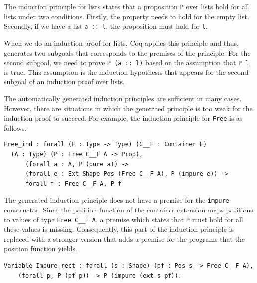\documentclass[a4paper, 11pt, fleqn, twoside]{scrreprt}
\newcommand{\cinl}[1]{\texttt{#1}}
\begin{document}
The induction principle for lists states that a proposition \cinl{P} over lists hold for all lists under two conditions.
Firstly, the property needs to hold for the empty list.
Secondly, if we have a list \cinl{a :: l}, the proposition must hold for \cinl{l}.

When we do an induction proof for lists, Coq applies this principle and thus, generates two subgoals that corresponds to the premises of the principle.
For the second subgoal, we need to prove \cinl{P (a :: l)} based on the assumption that \cinl{P l} is true.
This assumption is the induction hypothesis that appears for the second subgoal of an induction proof over lists.

The automatically generated induction principles are sufficient in many cases.
However, there are situations in which the generated principle is too weak for the induction proof to succeed.
For example, the induction principle for \cinl{Free} is as follows.

\begin{verbatim}
Free_ind : forall (F : Type -> Type) (C__F : Container F) 
  (A : Type) (P : Free C__F A -> Prop),
      (forall a : A, P (pure a)) -> 
      (forall e : Ext Shape Pos (Free C__F A), P (impure e)) -> 
      forall f : Free C__F A, P f
\end{verbatim}

The generated induction principle does not have a premise for the \cinl{impure} constructor.
Since the position function of the container extension maps positions to values of type \cinl{Free C__F A}, a premise which states that \cinl{P} must hold for all these values is missing.
Consequently, this part of the induction principle is replaced with a stronger version that adds a premise for the programs that the position function yields.

\begin{verbatim}
Variable Impure_rect : forall (s : Shape) (pf : Pos s -> Free C__F A),
    (forall p, P (pf p)) -> P (impure (ext s pf)).
\end{verbatim}
\end{document}
